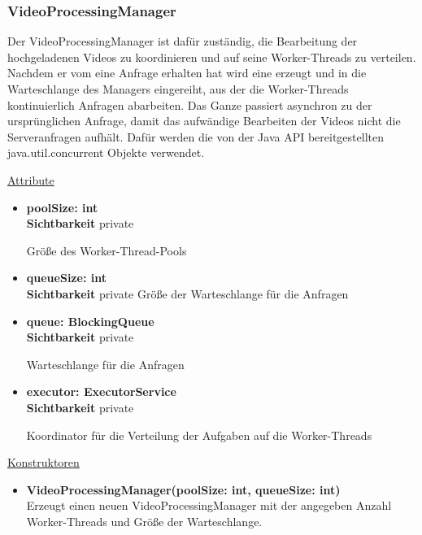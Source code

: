 \subsubsection{VideoProcessingManager} \label{service:klasse:VideoProcessingManager}
Der VideoProcessingManager ist dafür zuständig, die Bearbeitung der hochgeladenen Videos zu koordinieren und auf seine Worker-Threads zu verteilen. Nachdem er vom  eine Anfrage erhalten hat wird eine  erzeugt und in die Warteschlange des Managers eingereiht, aus der die Worker-Threads kontinuierlich Anfragen abarbeiten. Das Ganze passiert asynchron zu der ursprünglichen Anfrage, damit das aufwändige Bearbeiten der Videos nicht die Serveranfragen aufhält. Dafür werden die von der Java API bereitgestellten java.util.concurrent Objekte verwendet.

\underline{Attribute}
\begin{itemize}
\itemsep0pt
\item \textbf{poolSize: int} \hfill\\ 
\textbf{Sichtbarkeit} private

Größe des Worker-Thread-Pools

\item \textbf{queueSize: int} \hfill\\ 
\textbf{Sichtbarkeit} private
Größe der Warteschlange für die Anfragen


\item \textbf{queue: BlockingQueue} \hfill\\
\textbf{Sichtbarkeit} private 

Warteschlange für die Anfragen

\item \textbf{executor: ExecutorService} \hfill\\ 
\textbf{Sichtbarkeit} private

Koordinator für die Verteilung der Aufgaben auf die Worker-Threads
\end{itemize}

\underline{Konstruktoren}
\begin{itemize}
\itemsep0pt
\item \textbf{VideoProcessingManager(poolSize: int, queueSize: int)} \hfill\\
Erzeugt einen neuen VideoProcessingManager mit der angegeben Anzahl Worker-Threads und Größe der Warteschlange.
\end{itemize}


